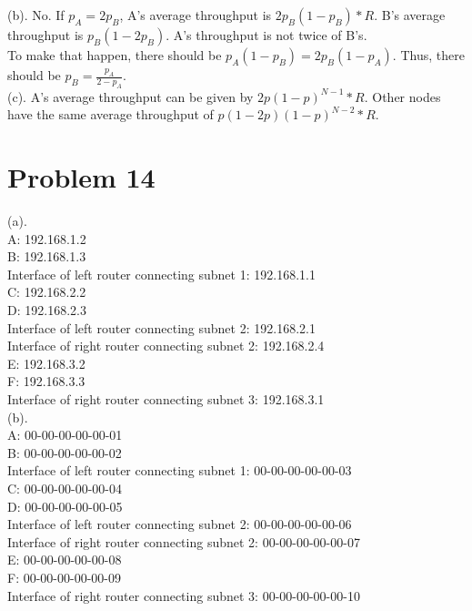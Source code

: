 \documentclass[titlepage, paper=a4, fontsize=11pt]{scrartcl} %
\numberwithin{equation}{section} %
\numberwithin{table}{section} %
\begin{document}
(b). No. If $p_A=2p_B$, A's average throughput is $2p_B(1-p_B)*R$. B's average throughput is
$p_B(1-2p_B)$. A's throughput is not twice of B's. \\
To make that happen, there should be $p_A(1-p_B)=2p_B(1-p_A)$. Thus, there should be $p_B=\frac{p_A}{2-p_A}$. \\

(c). A's average throughput can be given by $2p(1-p)^{N-1}*R$. Other nodes have the same average throughput of $p(1-2p)(1-p)^{N-2}*R$. \\





\section*{Problem 14}
(a). \\
A: 192.168.1.2 \\
B: 192.168.1.3 \\
Interface of left router connecting subnet 1: 192.168.1.1 \\
C: 192.168.2.2 \\
D: 192.168.2.3 \\
Interface of left router connecting subnet 2: 192.168.2.1 \\
Interface of right router connecting subnet 2: 192.168.2.4 \\
E: 192.168.3.2 \\
F: 192.168.3.3 \\
Interface of right router connecting subnet 3: 192.168.3.1 \\

(b). \\
A: 00-00-00-00-00-01 \\
B: 00-00-00-00-00-02 \\
Interface of left router connecting subnet 1: 00-00-00-00-00-03 \\
C: 00-00-00-00-00-04 \\
D: 00-00-00-00-00-05 \\
Interface of left router connecting subnet 2: 00-00-00-00-00-06 \\
Interface of right router connecting subnet 2: 00-00-00-00-00-07 \\
E: 00-00-00-00-00-08 \\
F: 00-00-00-00-00-09 \\
Interface of right router connecting subnet 3: 00-00-00-00-00-10 \\
\end{document}
